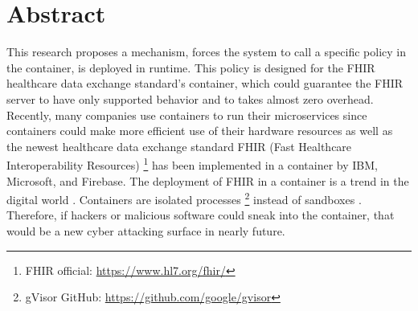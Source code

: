 \chapter*{Abstract}

This research proposes
a mechanism, forces the system to call a specific policy in the container, is deployed in
runtime. This policy is designed for the FHIR healthcare data exchange standard's container, which
could guarantee the FHIR server to have only supported behavior and to takes almost zero overhead.
Recently, many companies use containers to run their microservices since containers could
make more efficient use of their hardware resources as well as the newest healthcare data exchange
standard FHIR (Fast Healthcare Interoperability Resources)
\footnote{{FHIR official:  \href{https://www.hl7.org/fhir/}{https://www.hl7.org/fhir/}}} has been implemented
in a container by IBM, Microsoft, and Firebase. The deployment of FHIR in a container is a trend
in the digital world \cite{8473370}.
Containers are isolated processes \footnote{gVisor GitHub: \url{https://github.com/google/gvisor}}
instead of sandboxes \cite{10.5555/1267569.1267570}. Therefore, if hackers or malicious software could sneak
into the container, that would be a new cyber attacking surface in nearly future.